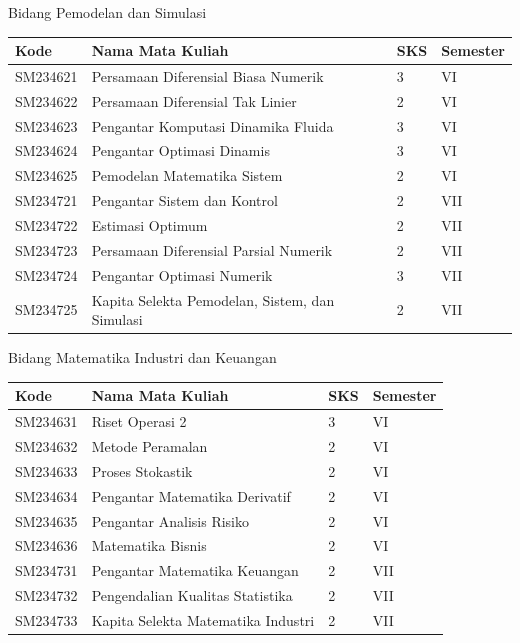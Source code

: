 \documentclass[aspectratio=169]{beamer} %
\begin{document}
\begin{frame}{Bidang Pemodelan dan Simulasi}

\begin{table}
	\renewcommand{\arraystretch}{1.3}
	\setlength{\tabcolsep}{10pt}
	\begin{tabular}{l l l l}
		\toprule
		\textbf{Kode} & \textbf{Nama Mata Kuliah} & \textbf{SKS} & \textbf{Semester} \\
		\midrule
		SM234621 & Persamaan Diferensial Biasa Numerik & 3 & VI \\
		SM234622 & Persamaan Diferensial Tak Linier & 2 & VI \\
		SM234623 & Pengantar Komputasi Dinamika Fluida & 3 & VI \\
		SM234624 & Pengantar Optimasi Dinamis & 3 & VI \\
		SM234625 & Pemodelan Matematika Sistem & 2 & VI \\
		SM234721 & Pengantar Sistem dan Kontrol & 2 & VII \\
		SM234722 & Estimasi Optimum & 2 & VII \\
		SM234723 & Persamaan Diferensial Parsial Numerik & 2 & VII \\
		SM234724 & Pengantar Optimasi Numerik & 3 & VII \\
		SM234725 & Kapita Selekta Pemodelan, Sistem, dan Simulasi & 2 & VII \\
		\bottomrule
	\end{tabular}
\end{table}

\end{frame}


\begin{frame}{Bidang Matematika Industri dan Keuangan}

\begin{table}
	\renewcommand{\arraystretch}{1.3}
	\setlength{\tabcolsep}{10pt}
	\begin{tabular}{l l l l}
		\toprule
		\textbf{Kode} & \textbf{Nama Mata Kuliah} & \textbf{SKS} & \textbf{Semester} \\
		\midrule
		SM234631 & Riset Operasi 2 & 3 & VI \\
		SM234632 & Metode Peramalan & 2 & VI \\
		SM234633 & Proses Stokastik & 2 & VI \\
		SM234634 & Pengantar Matematika Derivatif & 2 & VI \\
		SM234635 & Pengantar Analisis Risiko & 2 & VI \\
		SM234636 & Matematika Bisnis & 2 & VI \\
		SM234731 & Pengantar Matematika Keuangan & 2 & VII \\
		SM234732 & Pengendalian Kualitas Statistika & 2 & VII \\
		SM234733 & Kapita Selekta Matematika Industri & 2 & VII \\
		\bottomrule
	\end{tabular}
\end{table}

\end{frame}
\end{document}
